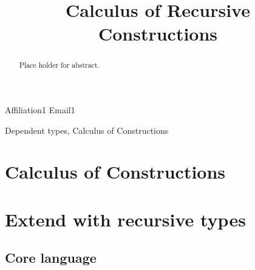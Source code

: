 \documentclass[preprint]{sigplanconf}
\theoremstyle{break}
\begin{document}
\setlength{\pdfpageheight}{\paperheight}
\setlength{\pdfpagewidth}{\paperwidth}





\preprintfooter{}   %

\title{Calculus of Recursive Constructions}
\subtitle{}

           {Affiliation1}
           {Email1}

\maketitle

\begin{abstract}
Place holder for abstract.
\end{abstract}



\keywords
Dependent types, Calculus of Constructions

\section{Calculus of Constructions}

\section{Extend with recursive types}
\subsection{Core language}
\end{document}
